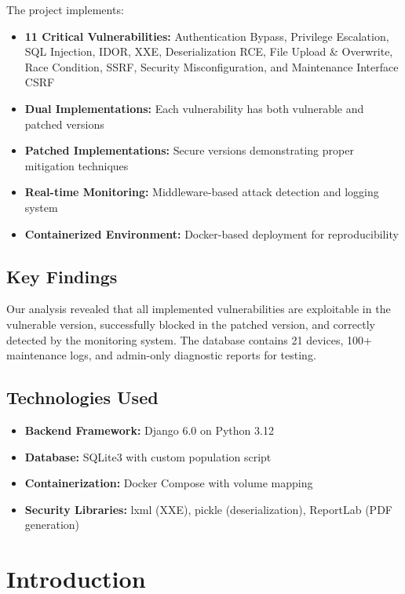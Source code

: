\documentclass[12pt,a4paper]{article}
\begin{document}
The project implements:
\begin{itemize}[leftmargin=*]
    \item \textbf{11 Critical Vulnerabilities:} Authentication Bypass, Privilege Escalation, SQL Injection, IDOR, XXE, Deserialization RCE, File Upload \& Overwrite, Race Condition, SSRF, Security Misconfiguration, and Maintenance Interface CSRF
    \item \textbf{Dual Implementations:} Each vulnerability has both vulnerable and patched versions
    \item \textbf{Patched Implementations:} Secure versions demonstrating proper mitigation techniques
    \item \textbf{Real-time Monitoring:} Middleware-based attack detection and logging system
    \item \textbf{Containerized Environment:} Docker-based deployment for reproducibility
\end{itemize}

\subsection{Key Findings}

Our analysis revealed that all implemented vulnerabilities are exploitable in the vulnerable version, successfully blocked in the patched version, and correctly detected by the monitoring system. The database contains 21 devices, 100+ maintenance logs, and admin-only diagnostic reports for testing.

\subsection{Technologies Used}

\begin{itemize}[leftmargin=*]
    \item \textbf{Backend Framework:} Django 6.0 on Python 3.12
    \item \textbf{Database:} SQLite3 with custom population script
    \item \textbf{Containerization:} Docker Compose with volume mapping
    \item \textbf{Security Libraries:} lxml (XXE), pickle (deserialization), ReportLab (PDF generation)
\end{itemize}

\newpage

\section{Introduction}
\end{document}
